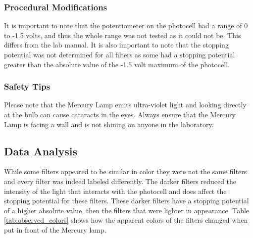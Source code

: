 \documentclass[a4paper]{article}
\begin{document}
\subsubsection{Procedural Modifications}

\qq It is important to note that the potentiometer on the photocell
had a range of 0 to -1.5 volts, and thus the whole range was not
tested as it could not be. This differs from the lab manual. It is
also important to note that the stopping potential was not determined
for all filters as some had a stopping potential greater than the
absolute value of the -1.5 volt maximum of the photocell.

\subsubsection{Safety Tips}

\qq Please note that the Mercury Lamp emits ultra-violet light and
looking directly at the bulb can cause cataracts in the eyes. Always
ensure that the Mercury Lamp is facing a wall and is not shining on
anyone in the laboratory.


\subsection{Data Analysis}


\qq While some filters appeared to be similar in color they were not
the same filters and every filter was indeed labeled differently. The
darker filters reduced the intensity of the light that interacts with
the photocell and does affect the stopping potential for these
filters. These darker filters have a stopping potential of a higher
absolute value, then the filters that were lighter in appearance. Table \ref{tab:observed_colors} shows how the apparent colors of the filters changed when put in front of the Mercury lamp.
\end{document}

